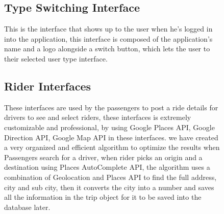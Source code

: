 \begin{figure}
\hspace*{\fill}
\hfill 
{}
\hspace*{\fill}
\end{figure}

\begin{figure}
\centering
{}
\end{figure}

\begin{figure}
\subsection{Type Switching Interface}
This is the interface that shows up to the user when he’s logged in into the application, this interface is composed of the application’s name and a logo alongside a switch button, which lets the user to their selected user type interface.
\begin{center}
\end{center}
\subsection{Rider Interfaces}
These interfaces are used by the passengers to post a ride details for drivers to see and select riders, these interfaces is extremely customizable and professional, by using Google Places API, Google Direction API, Google Map API in these interfaces. we have created a very organized and efficient algorithm to optimize the results when Passengers search for a driver, when rider picks an origin and a destination using Places AutoComplete API, the algorithm uses a combination of Geolocation and Places API to find the full address, city and sub city, then it converts the city into a number and saves all the information in the trip object for it to be saved into the database later.
\end{figure}

\begin{figure} 
\hspace*{\fill}
\hfill 
{}
\hspace*{\fill}
\end{figure}

